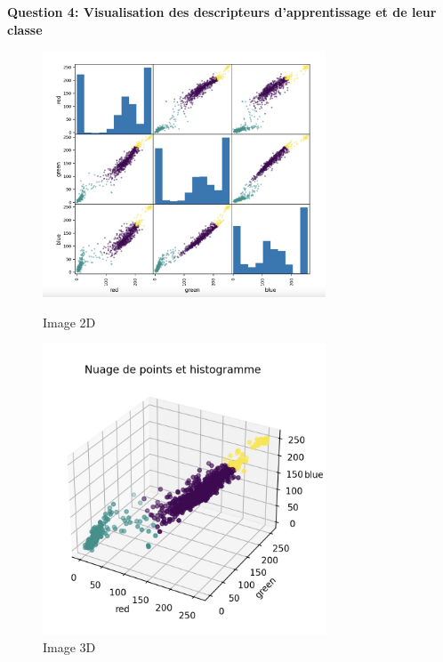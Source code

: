 \clearpage

\textbf{Question 4: Visualisation des descripteurs d'apprentissage et de leur classe}

\begin{figure}[!h]
    \begin{minipage}{.48\linewidth}
        \begin{center}
            \includegraphics[width=0.75\textwidth]{./img/6.4.1.jpg}
                \caption{\label{fig:6.4.1}Image 2D}  
            \end{center}
    \end{minipage}\hfill
    \begin{minipage}{.48\linewidth}
        \begin{center}
            \includegraphics[width=0.75\textwidth]{./img/6.4.2.jpg}
            \caption{\label{fig:6.4.2}Image 3D}  
        \end{center}
    \end{minipage}
\end{figure}

